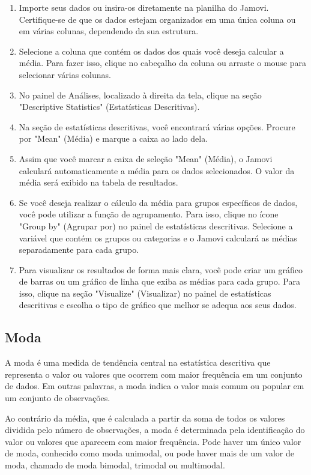 \begin{enumerate}
    \item Importe seus dados ou insira-os diretamente na planilha do Jamovi. Certifique-se de que os dados estejam organizados em uma única coluna ou em várias colunas, dependendo da sua estrutura.
    \item Selecione a coluna que contém os dados dos quais você deseja calcular a média. Para fazer isso, clique no cabeçalho da coluna ou arraste o mouse para selecionar várias colunas.
    \item No painel de Análises, localizado à direita da tela, clique na seção "Descriptive Statistics" (Estatísticas Descritivas).
    \item Na seção de estatísticas descritivas, você encontrará várias opções. Procure por "Mean" (Média) e marque a caixa ao lado dela.
    \item Assim que você marcar a caixa de seleção "Mean" (Média), o Jamovi calculará automaticamente a média para os dados selecionados. O valor da média será exibido na tabela de resultados.
    \item Se você deseja realizar o cálculo da média para grupos específicos de dados, você pode utilizar a função de agrupamento. Para isso, clique no ícone "Group by" (Agrupar por) no painel de estatísticas descritivas. Selecione a variável que contém os grupos ou categorias e o Jamovi calculará as médias separadamente para cada grupo.
    \item Para visualizar os resultados de forma mais clara, você pode criar um gráfico de barras ou um gráfico de linha que exiba as médias para cada grupo. Para isso, clique na seção "Visualize" (Visualizar) no painel de estatísticas descritivas e escolha o tipo de gráfico que melhor se adequa aos seus dados.
\end{enumerate}




\subsection{Moda}

A moda é uma medida de tendência central na estatística descritiva que representa o valor ou valores que ocorrem com maior frequência em um conjunto de dados. Em outras palavras, a moda indica o valor mais comum ou popular em um conjunto de observações.

Ao contrário da média, que é calculada a partir da soma de todos os valores dividida pelo número de observações, a moda é determinada pela identificação do valor ou valores que aparecem com maior frequência. Pode haver um único valor de moda, conhecido como moda unimodal, ou pode haver mais de um valor de moda, chamado de moda bimodal, trimodal ou multimodal.

